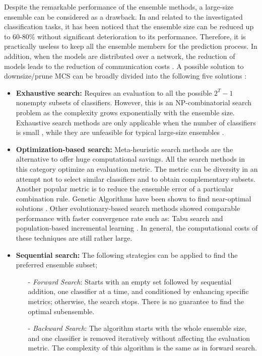 Despite the remarkable performance of the ensemble methods, a large-size ensemble can be considered as a drawback. In \cite{margineantu1997} and related to the investigated classification tasks, it has been noticed that the ensemble size can be reduced up to 60-80\% without significant deterioration to its performance. Therefore, it is practically useless to keep all the ensemble members for the prediction process. In addition, when the models are distributed over a network, the reduction of models leads to the reduction of communication costs \cite{tsoumakas2009}. A possible solution to downsize/prune MCS can be broadly divided into the following five solutions \cite{onan2017,mendes2012}:
 

 \begin{itemize}[noitemsep]
     \item \textbf{Exhaustive search:} Requires an evaluation to all the possible $2^{T}-1$ nonempty subsets of classifiers. However, this is an NP-combinatorial search problem as the complexity grows exponentially with the ensemble size. Exhaustive search methods are only applicable when the number of classifiers is small \cite{sharkey2000}, while they are unfeasible for typical large-size ensembles \cite{martinez2009}.
     \item \textbf{Optimization-based search:} Meta-heuristic search methods are the alternative to offer huge computational savings. All the search methods in this category optimize an evaluation metric. The metric can be diversity \cite{shipp2002} in an attempt not to select similar classifiers and to obtain complementary subsets. Another popular metric is to reduce the ensemble error of a particular combination rule. Genetic Algorithms have been shown to find near-optimal solutions \cite{adnan2016}. Other evolutionary-based search methods showed comparable performance with faster convergence rate such as: Tabu search \cite{roli2002} and population-based incremental learning \cite{ruta2001b}. In general, the computational costs of these techniques are still rather large.
     \item \textbf{Sequential search:} The following strategies can be applied to find the preferred ensemble subset;
     \begin{enumerate}[nosep]
         \item [-] \textit{Forward Search}: Starts with an empty set followed by sequential addition, one classifier at a time, and conditioned by enhancing specific metrics; otherwise, the search stops. There is no guarantee to find the optimal subensemble.
         \item[-] \textit{Backward Search}: The algorithm starts with the whole ensemble size, and one classifier is removed iteratively without affecting the evaluation metric. The complexity of this algorithm is the same as in forward search. 
     \end{enumerate}


\end{itemize}
